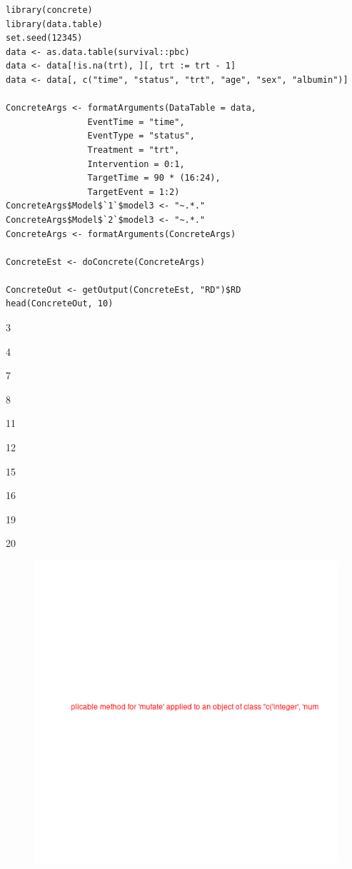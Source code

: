 \documentclass{report}
\newcommand{\1}{\ensuremath{\mathbf{1}}}
\begin{document}
\begin{lstlisting}
library(concrete)
library(data.table)
set.seed(12345)
data <- as.data.table(survival::pbc)
data <- data[!is.na(trt), ][, trt := trt - 1]
data <- data[, c("time", "status", "trt", "age", "sex", "albumin")]

ConcreteArgs <- formatArguments(DataTable = data,
				EventTime = "time",
				EventType = "status",
				Treatment = "trt",
				Intervention = 0:1,
				TargetTime = 90 * (16:24),
				TargetEvent = 1:2)
ConcreteArgs$Model$`1`$model3 <- "~.*."
ConcreteArgs$Model$`2`$model3 <- "~.*."
ConcreteArgs <- formatArguments(ConcreteArgs)

ConcreteEst <- doConcrete(ConcreteArgs)

ConcreteOut <- getOutput(ConcreteEst, "RD")$RD
head(ConcreteOut, 10)
\end{lstlisting}



3

4

7

8

11

12

15

16

19

20

\begin{figure}[H]
\includegraphics[width=0.9\linewidth]{concrete-pbc.png}
\end{figure}
\end{document}
